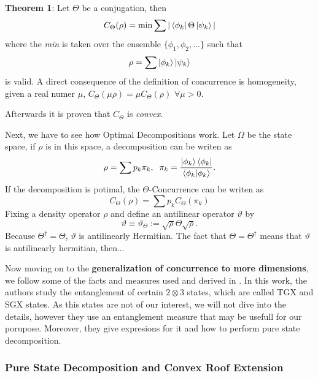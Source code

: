 \textbf{Theorem 1}: Let $\Theta$ be a conjugation, then 
\begin{equation}
    C_\Theta(\rho)=\min\sum|\bra{\phi_k}\Theta\ket{\psi_k}|
\end{equation}
where the \textit{min} is taken over the ensemble $\{\phi_1,\phi_2,...\}$ such that
\begin{equation}
    \rho=\sum\ket{\phi_k}\ket{\psi_k}
\end{equation}
is valid. A direct consequence of the definition of concurrence is homogeneity, given a real numer $\mu$, $C_\Theta(\mu\rho)=\mu C_\Theta(\rho)$ $\forall \mu>0$.

Afterwards it is proven that $C_\Theta$ is \textit{convex}.

Next, we have to see how Optimal Decompositions work. Let $\Omega$ be the state space, if $\rho$ is in this space, a decomposition can be writen as 
\begin{equation}
    \rho=\sum p_k \pi_k, \;\; \pi_k=\frac{\ket{\phi_k}\bra{\phi_k}}{\braket{\phi_k}{\phi_k}}.
\end{equation}
If the decomposition is potimal, the $\Theta$-Concurrence can be writen as
\begin{equation}
    C_\Theta(\rho)=\sum p_kC_\Theta(\pi_k)
\end{equation}
Fixing a density operator $\rho$ and define an antilinear operator $\vartheta$ by
\begin{equation}
    \vartheta \equiv \vartheta_\Theta := \sqrt{\rho}\Theta\sqrt{\rho}.
\end{equation}
Because $\Theta^\dagger=\Theta$, $\vartheta$ is antilinearly Hermitian. The fact that $\Theta=\Theta^\dagger$ means that $\vartheta$ is antilinearly hermitian, then...

Now moving on to the \textbf{generalization of concurrence to more dimensions}, we follow some of the facts and measures used and derived in \cite{arXiv:2208.04745v1  [quant-ph]  2 Aug 2022}. In this work, the authors study the entanglement of certain $2\otimes3$ states, which are called TGX and SGX states. As this states are not of our interest, we will not dive into the details, however they use an entanglement measure that may be usefull for our porupose. Moreover, they give expresions for it and how to perform pure state decomposition. 

\subsubsection{Pure State Decomposition and Convex Roof Extension}\label{subsubsec:convex_roof_ext}

